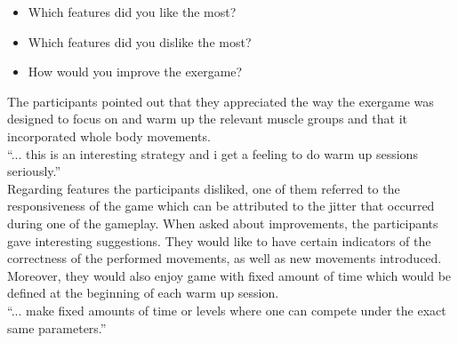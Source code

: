 \begin{itemize}
 \item Which features did you like the most?
 \item Which features did you dislike the most?
 \item How would you improve the exergame?
\end{itemize}
The participants pointed out that they appreciated the way the exergame was designed to focus on and warm up the relevant muscle groups and that it incorporated whole body movements.\\
``... this is an interesting strategy and i get a feeling to do warm up sessions seriously.''\\ Regarding features the participants disliked, one of them referred to the responsiveness of the game which can be attributed to the jitter that occurred during one of the gameplay. When asked about improvements, the participants  gave interesting suggestions. They would like to have certain indicators of the correctness of the performed movements, as well as new movements introduced. Moreover, they would also enjoy  game with fixed amount of time which would be defined at the beginning of each warm up session. \\
``... make fixed amounts of time or levels where one can compete under the exact same parameters.''
